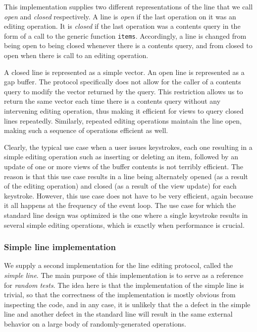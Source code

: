 This implementation supplies two different representations of the line
that we call \emph{open} and \emph{closed} respectively.  A line is
\emph{open} if the last operation on it was an editing operation.  It
is \emph{closed} if the last operation was a contents query in the
form of a call to the generic function \texttt{items}.  Accordingly, a
line is changed from being open to being closed whenever there is a
contents query, and from closed to open when there is call to an
editing operation.

A closed line is represented as a \commonlisp{} simple vector.  An
open line is represented as a gap buffer. 
The protocol specifically does not allow for the caller of a contents
query to modify the vector returned by the query.  This restriction
allows us to return the same vector each time there is a contents
query without any intervening editing operation, thus making it
efficient for views to query closed lines repeatedly.  Similarly,
repeated editing operations maintain the line open, making such a
sequence of operations efficient as well.

Clearly, the typical use case when a user issues keystrokes, each one
resulting in a simple editing operation such as inserting or deleting
an item, followed by an update of one or more views of the buffer
contents is not terribly efficient.  The reason is that this use case
results in a line being alternately opened (as a result of the editing
operation) and closed (as a result of the view update) for each
keystroke.  However, this use case does not have to be very efficient,
again because it all happens at the frequency of the event loop.  The
use case for which the standard line design was optimized is the one
where a single keystroke results in several simple editing operations,
which is exactly when performance is crucial.

\subsubsection{Simple line implementation}

We supply a second implementation for the line editing protocol,
called the \emph{simple line}.  The main purpose of this
implementation is to serve as a reference for \emph{random tests}.
The idea here is that the implementation of the simple line is
trivial, so that the correctness of the implementation is mostly
obvious from inspecting the code, and in any case, it is unlikely that
the a defect in the simple line and another defect in the standard
line will result in the same external behavior on a large body of
randomly-generated operations.

